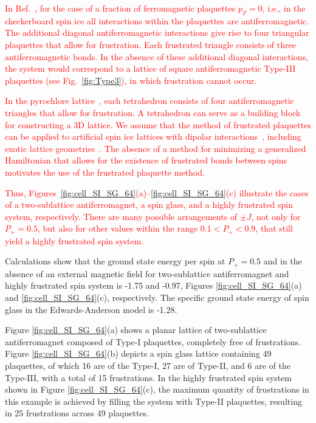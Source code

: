 \documentclass[preprint,12pt]{elsarticle}
\begin{document}
	\textcolor{red}{In Ref.~\cite{kato2022flux}, for the case of a fraction of ferromagnetic plaquettes $p_F = 0$, i.e., in the checkerboard spin ice all interactions within the plaquettes are antiferromagnetic. The additional diagonal antiferromagnetic interactions give rise to four triangular plaquettes that allow for frustration. Each frustrated triangle consists of three antiferromagnetic bonds. In the absence of these additional diagonal interactions, the system would correspond to a lattice of square antiferromagnetic Type-III plaquettes (see Fig.~\ref{fig:Type3}), in which frustration cannot occur.}
	
	\textcolor{red}{In the pyrochlore lattice~\cite{peretyatko2017interplay, otsuka2018husimi}, each tetrahedron consists of four antiferromagnetic triangles that allow for frustration. A tetrahedron can serve as a building block for constructing a 3D lattice. We assume that the method of frustrated plaquettes can be applied to artificial spin ice lattices with dipolar interactions~\cite{andriushchenko2019large, shevchenko2017effect}, including exotic lattice geometries~\cite{makarova2021low, shevchenko2022order, makarov2019numerical}. The absence of a method for minimizing a generalized Hamiltonian that allows for the existence of frustrated bonds between spins motivates the use of the frustrated plaquette method.}
	
	\textcolor{red}{Thus, Figures~\ref{fig:cell_SI_SG_64}(a)--\ref{fig:cell_SI_SG_64}(c) illustrate the cases of a two-sublattice antiferromagnet, a spin glass, and a highly frustrated spin system, respectively.
	There are many possible arrangements of $\pm J$, not only for $P_+=0.5$, but also for other values within the range $0.1<P_+<0.9$, that still yield a highly frustrated spin system.}
	
	
	Calculations show that the ground state energy per spin at $P_+ = 0.5$ and in the absence of an external magnetic field for two-sublattice antiferromagnet and highly frustrated spin system is -1.75 and -0.97, Figures \ref{fig:cell_SI_SG_64}(a) and \ref{fig:cell_SI_SG_64}(c), respectively. The specific ground state energy of spin glass in the Edwards-Anderson model is -1.28.
	
	Figure \ref{fig:cell_SI_SG_64}(a) shows a planar lattice of two-sublattice antiferromagnet composed of Type-I plaquettes, completely free of frustrations.
	Figure \ref{fig:cell_SI_SG_64}(b) depicts a spin glass lattice containing 49 plaquettes, of which 16 are of the Type-I, 27 are of Type-II, and 6 are of the Type-III, with a total of 15 frustrations.
	In the highly frustrated spin system shown in Figure \ref{fig:cell_SI_SG_64}(c), the maximum quantity of frustrations in this example is achieved by filling the system with Type-II plaquettes, resulting in 25 frustrations across 49 plaquettes.
	
\end{document}
